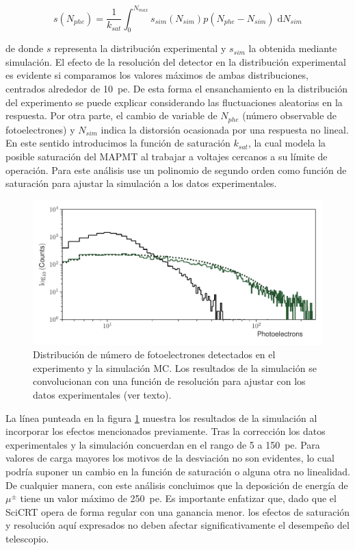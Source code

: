 \begin{equation}
\label{equ:nphe}
s(N_{phe})=\frac{1}{k_{sat}}\int_{0}^{N_{max}} s_{sim}(N_{sim})p(N_{phe}-N_{sim})\;\mathrm{d}N_{sim}
\end{equation}

de donde $s$ representa la distribución experimental y $s_{sim}$ la obtenida mediante simulación. El efecto de la resolución del detector en la distribución experimental es evidente si comparamos los valores máximos de ambas distribuciones, centrados alrededor de \SI{10}{pe}. De esta forma el ensanchamiento en la distribución del experimento se puede explicar considerando las fluctuaciones aleatorias en la respuesta. Por otra parte, el cambio de variable de $N_{phe}$ (número observable de fotoelectrones) y $N_{sim}$ indica la distorsión ocasionada por una respuesta no lineal. En este sentido introducimos la función de saturación $k_{sat}$, la cual modela la posible saturación del MAPMT al trabajar a voltajes cercanos a su límite de operación. Para este análisis use un polinomio de segundo orden como función de saturación para ajustar la simulación a los datos experimentales.

\begin{figure}
        \centering
        \includegraphics[width=\textwidth]{photons-number.pdf}
        \caption{Distribución de número de fotoelectrones detectados en el experimento y la simulación MC. Los resultados de la simulación se convolucionan con una función de resolución para ajustar con los datos experimentales (ver texto).}
        \label{fig:photons-number}
\end{figure}

La línea punteada en la figura \ref{fig:photons-number} muestra los resultados de la simulación al incorporar los efectos mencionados previamente. Tras la corrección los datos experimentales y la simulación concuerdan en el rango de \num{5} a \SI{150}{pe}. Para valores de carga mayores los motivos de la desviación no son evidentes, lo cual podría suponer un cambio en la función de saturación o alguna otra no linealidad. De cualquier manera, con este análisis concluimos que la deposición de energía de $\mu^{\pm}$ tiene un valor máximo de \SI{250}{pe}. Es importante enfatizar que, dado que el SciCRT opera de forma regular con una ganancia menor. los efectos de saturación y resolución aquí expresados no deben afectar significativamente el desempeño del telescopio.
